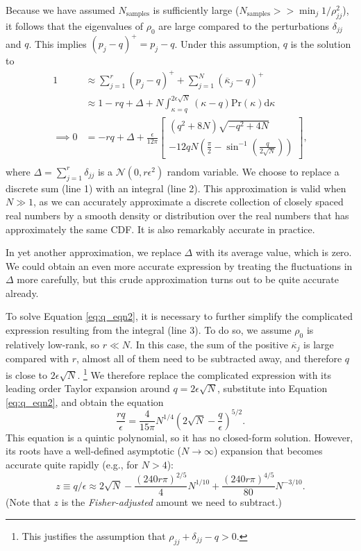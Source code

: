 \documentclass[aps,pra, twocolumn]{revtex4-1}
\begin{document}
Because we have assumed $N_{\mathrm{samples}}$ is sufficiently large ($N_{\mathrm{samples}} >> \min_{j}1/\rho_{jj}^{2}$), it follows that the eigenvalues of $\rho_{0}$ are large compared to the perturbations $\delta_{jj}$ and $q$. This implies $(p_{j} - q)^{+} = p_{j} - q$. Under this assumption, $q$ is the solution to
\begin{align}
\nonumber 1 &\approx \sum_{j=1}^{r}(p_j - q)^{+} + \sum_{j=1}^{N}{(\overline{\kappa}_j-q)^+}\\
\nonumber &\approx 1 - rq + \Delta + N\int_{\kappa=q}^{2\epsilon\sqrt{N}}{(\kappa-q)\mathrm{Pr}(\kappa)\mathrm{d}\kappa}\\
\label{eq:q_eqn2}\implies 0 &= - rq + \Delta + \frac{\epsilon}{12\pi}\left[
\begin{array}{l} (q^2+8N)\sqrt{-q^2+4N} \\
-12qN\left(\frac{\pi}{2}-\sin^{-1}\left(\frac{q}{2\sqrt{N}}\right)\right)
\end{array}\right],\nonumber\\
~
\end{align}
where $\Delta = \sum_{j=1}^{r}\delta_{jj}$ is a $\mathcal{N}(0,r\epsilon^2)$ random variable.  We choose to replace a discrete 
sum (line 1) with an integral (line 2). This approximation is valid when $N\gg1$, as we can accurately approximate a discrete collection of closely spaced real numbers by a smooth density or distribution over the real numbers that has approximately the same CDF.  It is also remarkably accurate in practice.
  
In yet another approximation, we replace $\Delta$ with its average value, which is zero.  We could obtain an even more accurate expression 
 by treating the fluctuations in $\Delta$ more carefully, but this crude approximation turns out to be quite accurate already.

To solve Equation \eqref{eq:q_eqn2}, it is necessary to further simplify the complicated expression resulting from the integral (line 3).  To do so, we 
assume  $\rho_0$ is relatively low-rank, so $r \ll N$.  In this case, the sum of the positive $\overline{\kappa}_j$ is large compared 
with $r$, almost all of them need to be subtracted away, and therefore $q$ is close to $2\epsilon\sqrt{N}$.  \footnote{This justifies the assumption that $\rho_{jj} + \delta_{jj} - q > 0$.} We therefore replace 
the complicated expression with its leading order Taylor expansion around $q=2\epsilon\sqrt{N}$, substitute into Equation \eqref{eq:q_eqn2}, and 
obtain the equation
\begin{equation}
\frac{rq}{\epsilon}  = \frac{4}{15\pi}N^{1/4}\left(2\sqrt{N}-\frac{q}{\epsilon}\right)^{5/2}.
\end{equation}
This equation is a quintic polynomial, so it has no closed-form solution.  However, its roots have a well-defined asymptotic ($N\to
\infty$) expansion that becomes accurate quite rapidly (e.g., for $N>4$):
\begin{equation}
\label{eq:truncation}
z \equiv q/\epsilon \approx 2\sqrt{N}-\frac{(240r\pi)^{2/5}}{4}N^{1/10}+\frac{(240r\pi)^{4/5}}{80}N^{-3/10}.
\end{equation}
(Note that $z$ is the \emph{Fisher-adjusted} amount we need to subtract.)
\end{document}
